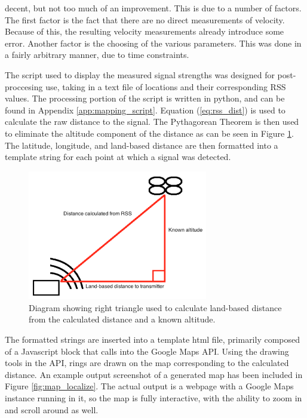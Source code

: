 decent, but not too much of an improvement. This is due to a number of factors.
The first factor is the fact that there are no direct measurements of velocity.
Because of this, the resulting velocity measurements already introduce some error.
Another factor is the choosing of the various parameters. This was done in a fairly
arbitrary manner, due to time constraints. \par 
The script used to display the measured signal strengths was designed for post-proccesing use, taking in a text file of locations and their corresponding RSS values. The processing portion of the script is written in python, and can be found in Appendix \ref{app:mapping_script}. Equation (\ref{eq:rss_dist}) is used to calculate the raw distance to the signal. The Pythagorean Theorem is then used to eliminate the altitude component of the distance as can be seen in Figure \ref{fig:dist_pyth}. The latitude, longitude, and land-based distance are then formatted into a template string for each point at which a signal was detected.\par
\begin{figure}[h!]
\centering
\includegraphics[width=0.70\textwidth]{img/distance_pythag_diagram.png}
\caption{Diagram showing right triangle used to calculate land-based distance from the calculated distance and a known altitude.}
\label{fig:dist_pyth}
\end{figure}
The formatted strings are inserted into a template html file, primarily composed of a Javascript block that calls into the Google Maps API. Using the drawing tools in the API, rings are drawn on the map corresponding to the calculated distance. An example output screenshot of a generated map has been included in Figure \ref{fig:map_localize}. The actual output is a webpage with a Google Maps instance running in it, so the map is fully interactive, with the ability to zoom in and scroll around as well.\par
